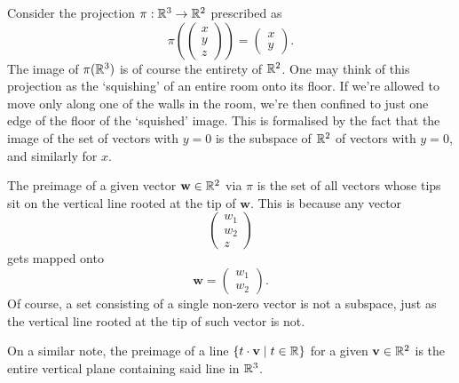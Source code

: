 \begin{example}{}{}
 Consider the projection $\pi:\mathbb{R}^3 \to \mathbb{R}^2$ prescribed as
 \[
  \pi \left( 
  \begin{pmatrix}
   x\\
   y\\
   z
  \end{pmatrix}
  \right) = 
  \begin{pmatrix}
   x\\
   y
  \end{pmatrix}.
 \]
 The image of $\pi(\mathbb{R}^3)$ is of course the entirety of $\mathbb{R}^2$. One may think of
 this projection as the `squishing' of an entire room onto its floor. If we're
 allowed to move only along one of the walls in the room, we're then confined to
 just one edge of the floor of the `squished' image. This is formalised by the
 fact that the image of the set of vectors with $y = 0$ is the subspace of
 $\mathbb{R}^2$ of vectors with $y = 0$, and similarly for $x$.

 \begin{center}
 \end{center}

 The preimage of a given vector $\mathbf{w} \in \mathbb{R}^2$ via $\pi$ is the set of
 all vectors whose tips sit on the vertical line rooted at the tip of
 $\mathbf{w}$. This is because any vector
 \[
  \begin{pmatrix}
   w_1\\
   w_2\\
   z
  \end{pmatrix}
 \]
 gets mapped onto
 \[
  \mathbf{w} = 
  \begin{pmatrix}
   w_1\\
   w_2
  \end{pmatrix}.
 \]
 Of course, a set consisting of a single non-zero vector is not a subspace, just
 as the vertical line rooted at the tip of such vector is not. 

 On a similar note, the preimage of a line $\{t \cdot \mathbf{v} \mid t \in
 \mathbb{R}\}$ for a given $\mathbf{v} \in \mathbb{R}^2$ is the entire vertical plane containing
 said line in $\mathbb{R}^3$.
\end{example}

